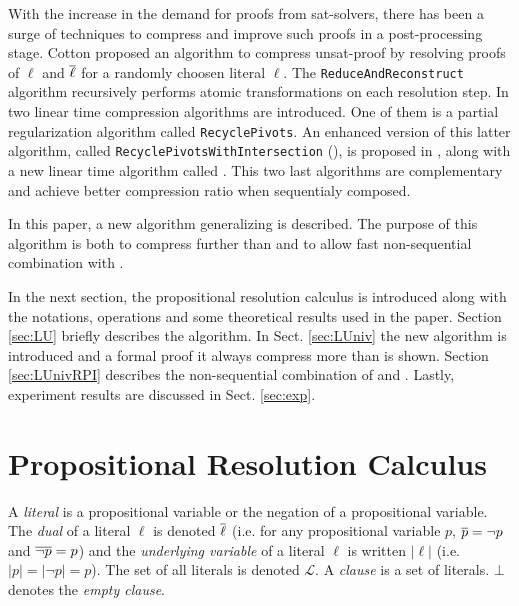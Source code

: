 \documentclass{llncs}
\begin{document}

With the increase in the demand for proofs from sat-solvers, there has been a surge of techniques to
compress and improve such proofs in a post-processing stage.
Cotton \cite{CottonSplit} proposed an
algorithm to compress unsat-proof by resolving proofs of $\ell$ and $\overline{\ell}$ for a randomly
choosen literal $\ell$.
The \texttt{ReduceAndReconstruct} algorithm \cite{RedRec} recursively
performs atomic transformations on each resolution step. In \cite{RP08} two linear time compression
algorithms are introduced. One of them is a partial regularization algorithm called
\texttt{RecyclePivots}.  An enhanced version of this latter algorithm, called
\texttt{RecyclePivotsWithIntersection} ({\RPI}), is proposed in \cite{LURPI}, along with a new
linear time algorithm called {\LowerUnits}.  This two last algorithms are complementary and achieve
better compression ratio when sequentialy composed.

In this paper, a new algorithm generalizing {\LowerUnits} is described. The purpose of this algorithm
is both to compress further than {\LowerUnits} and to allow fast non-sequential combination with
{\RPI}.

In the next section, the propositional resolution calculus is introduced along with the notations, operations
and some theoretical results used in the paper. Section \ref{sec:LU} briefly describes the
{\LowerUnits} algorithm. In Sect. \ref{sec:LUniv} the new algorithm {\LowerUnivalents} is introduced and a
formal proof it always compress more than {\LowerUnits} is shown. Section \ref{sec:LUnivRPI}
describes the non-sequential combination of {\LowerUnivalents} and {\RPI}. Lastly,
experiment results are discussed in Sect. \ref{sec:exp}.



\section{Propositional Resolution Calculus}

A \emph{literal} is a propositional variable or the negation of a propositional variable. The
\emph{dual} of a literal $\ell$ is denoted $\overline{\ell}$ (i.e. for any propositional variable $p$,
$\overline{p} = \neg p$ and $\overline{\neg p} = p$) and the \emph{underlying variable} of a literal $\ell$
is written $|\ell|$ (i.e. $|p| = |\neg p| = p$). The set of all literals is denoted $\mathcal{L}$. A
\emph{clause} is a set of literals. $\bot$ denotes the \emph{empty clause}.
\end{document}
